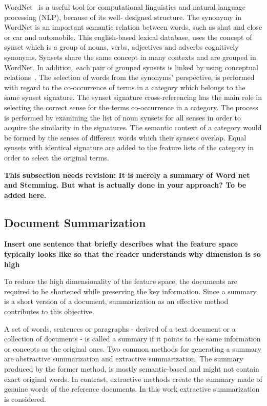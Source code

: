 \documentclass{sigchi}
\begin{document}
WordNet~\cite{miller1990introduction} is a useful tool for computational linguistics and natural language processing (NLP), because of its well-
designed structure. 
The synonymy in WordNet is an important semantic relation between words, such as shut and close or car and automobile. 
This english-based lexical database, uses the concept of synset which is a group of nouns, verbs, adjectives and adverbs cognitively synonyms.
Synsets share the same concept in many contexts and are grouped in WordNet.
In addition, each pair of grouped synsets is linked by using conceptual relations~\cite{1410799}. 
The selection of words from the synonyms’ perspective, is performed with regard to the co-occurrence of terms in a category which belongs to the same synset signature. 
The synset signature cross-referencing has the main role in selecting the correct sense for the terms co-occurrence in a category. The process is performed by examining the list of noun synsets for all senses in order to acquire the similarity in the signatures. 
The semantic context of a category would be formed by the senses of different words which their synsets overlap.
Equal synsets with identical signature are added to the feature lists of the category in order to select the original terms.

\textbf{This subsection needs revision: It is merely a summary of Word net and Stemming. But what is actually done in your approach? To be added here.}

\subsection{Document Summarization}\label{sectionSummarization}
\textbf{Insert one sentence that briefly describes what the feature space typically looks like so that the reader understands why dimension is so high}

To reduce the high dimensionality of the feature space, the documents are required to be shortened while preserving the key information. 
Since a summary is a short version of a document, summarization as an effective method contributes to this objective.

A set of words, sentences or paragraphs - derived of a text document or a collection of documents - is called a summary if it points to the same information or concepts as the original ones. 
Two common methods for generating a summary are abstractive summarization and extractive summarization. 
The summary produced by the former method, is mostly semantic-based and might not contain exact original words. 
In contrast, extractive methods create the summary made of genuine words of the reference documents. 
In this work extractive summarization is considered.
\end{document}
